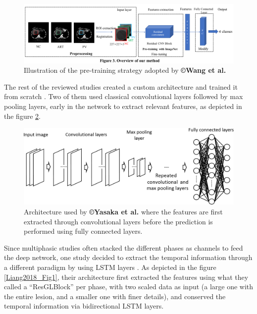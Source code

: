 \begin{figure}[th!]
\centering
\includegraphics[width=0.9\linewidth]{images/image6}
\caption{Illustration of the pre-training strategy adopted by \textbf{©Wang et al.} \cite{Wang2018}}
\label{Wang2018_Fig3}
\end{figure}


The rest of the reviewed studies created a custom architecture and
trained it from scratch \cite{Yasaka2018a,Yasaka2018,Liang2018,Yang2019}.
Two of them used classical convolutional layers followed by max pooling
layers, early in the network to extract relevant features, as depicted
in the figure \ref{Yasaka2018_Fig2}.

\begin{figure}[th!]
\centering
\includegraphics[width=0.7\linewidth]{images/yasaka2018}
\caption{Architecture used by \textbf{©Yasaka et al.} where the features are first extracted through convolutional layers before the prediction is performed using fully connected layers. \cite{Yasaka2018}}
\label{Yasaka2018_Fig2}
\end{figure}

Since multiphasic studies often stacked the different phases as channels
to feed the deep network, one study decided to extract the temporal
information through a different paradigm by using LSTM layers \cite{Liang2018}. As depicted
in the figure \ref{Liang2018_Fig1}, their architecture first extracted the features using what they
called a ``ResGLBlock'' per phase, with two scaled data as input (a
large one with the entire lesion, and a smaller one with finer details),
and conserved the temporal information via bidirectional LSTM
layers.

